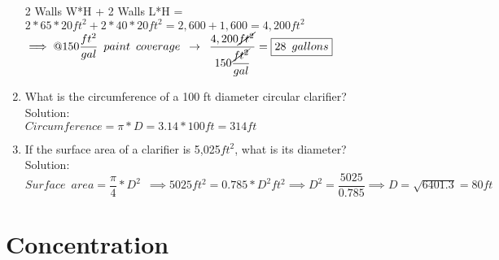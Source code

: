 \documentclass{article}
\begin{document}
\begin{enumerate}
\begin{center}
\\
\end{center}
2 Walls W*H + 2 Walls L*H = $2*65*20ft^2 + 2*40*20ft^2= 2,600+1,600=4,200ft^2$\\
$\implies @150\dfrac{ft^2}{gal} \enspace paint \enspace coverage \enspace \rightarrow \enspace \dfrac{4,200\cancel{ft^2}}{150\dfrac{\cancel{ft^2}}{gal}}=\boxed{28 \enspace gallons}$

\item What is the circumference of a 100 ft diameter circular clarifier?\\
Solution:\\
$Circumference=\pi*D=3.14*100ft=\boxed{314ft}$

\item If the surface area of a clarifier is 5,025$ft^2$, what is its diameter?\\
Solution:\\
$Surface \enspace area=\dfrac{\pi}{4}*D^2 \enspace \implies 5025ft^2=0.785*D^2 ft^2\implies D^2=\dfrac{5025}{0.785} \implies D=\sqrt{6401.3}=\boxed{80ft}$

\end{enumerate}

\section{Concentration}
\end{document}
